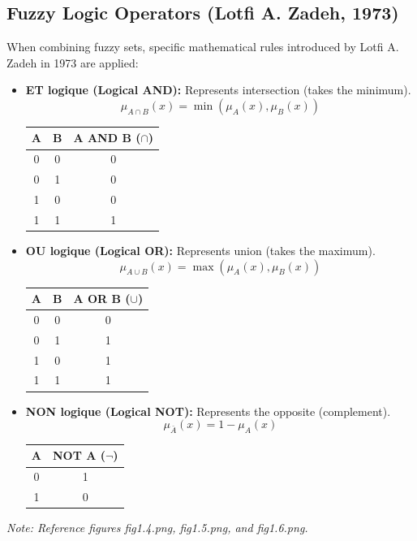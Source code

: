 \documentclass[11pt,a4paper]{article}
\begin{document}
\subsection{Fuzzy Logic Operators (Lotfi A. Zadeh, 1973)}
When combining fuzzy sets, specific mathematical rules introduced by Lotfi A. Zadeh in 1973 are applied:
\begin{itemize}
    \item \textbf{ET logique (Logical AND):} Represents intersection (takes the minimum).
    \[ \mu_{A \cap B}(x) = \min(\mu_A(x), \mu_B(x)) \]
    \begin{center}
        \begin{tabular}{|c|c|c|}
            \hline
            A & B & A AND B ($\cap$) \\ \hline
            0 & 0 & 0 \\ \hline
            0 & 1 & 0 \\ \hline
            1 & 0 & 0 \\ \hline
            1 & 1 & 1 \\ \hline
        \end{tabular}
    \end{center}
    
    \item \textbf{OU logique (Logical OR):} Represents union (takes the maximum).
    \[ \mu_{A \cup B}(x) = \max(\mu_A(x), \mu_B(x)) \]
    \begin{center}
        \begin{tabular}{|c|c|c|}
            \hline
            A & B & A OR B ($\cup$) \\ \hline
            0 & 0 & 0 \\ \hline
            0 & 1 & 1 \\ \hline
            1 & 0 & 1 \\ \hline
            1 & 1 & 1 \\ \hline
        \end{tabular}
    \end{center}
    
    \item \textbf{NON logique (Logical NOT):} Represents the opposite (complement).
    \[ \mu_{\bar{A}}(x) = 1 - \mu_A(x) \]
    \begin{center}
        \begin{tabular}{|c|c|}
            \hline
            A & NOT A ($\neg$) \\ \hline
            0 & 1 \\ \hline
            1 & 0 \\ \hline
        \end{tabular}
    \end{center}
\end{itemize}
\textit{Note: Reference figures fig1.4.png, fig1.5.png, and fig1.6.png.}
\end{document}
